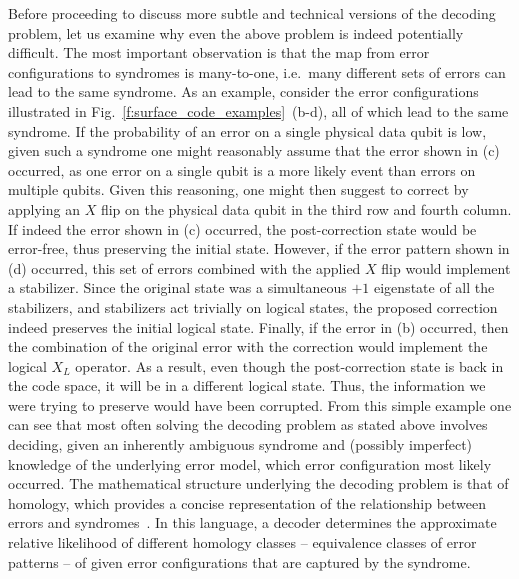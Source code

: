 \documentclass[twocolumn,preprintnumbers,amsmath,amssymb,notitlepage,nofootinbib,longbibliography,superscriptaddress,aps,pra,10pt]{revtex4-1}
\begin{document}
	\noindent Before proceeding to discuss more subtle and technical versions of the decoding problem, let us examine why even the above problem is indeed potentially difficult.
	The most important observation is that the map from error configurations to syndromes is many-to-one, i.e.\ many different sets of errors can lead to the same syndrome.
	As an example, consider the error configurations illustrated in Fig.~\ref{f:surface_code_examples}~(b-d), all of which lead to the same syndrome.
	If the probability of an error on a single physical data qubit is low, given such a syndrome one might reasonably assume that the error shown in (c) occurred, as one error on a single qubit is a more likely event than errors on multiple qubits.
	Given this reasoning, one might then suggest to correct by applying an $X$ flip on the physical data qubit in the third row and fourth column.
	If indeed the error shown in (c) occurred, the post-correction state would be error-free, thus preserving the initial state.
	However, if the error pattern shown in (d) occurred, this set of errors combined with the applied $X$ flip would implement a stabilizer.
	Since the original state was a simultaneous $+1$ eigenstate of all the stabilizers, and stabilizers act trivially on logical states, the proposed correction indeed preserves the initial logical state.
	Finally, if the error in (b) occurred, then the combination of the original error with the correction would implement the logical $X_L$ operator.
	As a result, even though the post-correction state is back in the code space, it will be in a different logical state.
	Thus, the information we were trying to preserve would have been corrupted.
	From this simple example one can see that most often solving the decoding problem as stated above involves deciding, given 
	an inherently ambiguous syndrome and (possibly imperfect) knowledge of the underlying error model, which error configuration most likely occurred.
	The mathematical structure underlying the decoding problem is that of homology, which provides a 
	concise representation of the relationship between errors and syndromes~\cite{FastDecoders}.
	In this language,
	a decoder determines the approximate relative likelihood of different homology classes -- equivalence classes of 
	error patterns -- of given error configurations that are captured by the syndrome.
\end{document}
